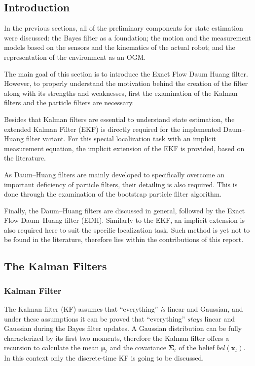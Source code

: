 \subsection{Introduction}

In the previous sections, all of the preliminary components for
state estimation were discussed:
the Bayes filter as a foundation;
the motion and the measurement models based on the
sensors and the kinematics of the actual robot;
and the representation of the environment as an OGM.

The main goal of this section is to introduce the Exact Flow Daum Huang filter. However, to properly understand the motivation behind
the creation of the filter along with its strengths and weaknesses, first the
examination of the Kalman filters and the particle filters are necessary.

Besides that Kalman filters are essential to understand state estimation,
the extended Kalman Filter (EKF) is directly required for the implemented Daum--Huang filter variant. For this special localization task with
an implicit measurement equation, the implicit extension of the EKF is provided, based on the literature.

As Daum--Huang filters are mainly developed to specifically overcome
an important deficiency of particle filters, their detailing is
also required. This is done through the examination of the bootstrap particle filter algorithm.

Finally, the Daum--Huang filters are discussed in general,
followed by the Exact Flow Daum--Huang filter (EDH). Similarly to the EKF,
an implicit extension is also required here to suit the
specific localization task. Such method is  yet not to be found in the literature, therefore lies within the contributions
of this report.
\subsection{The Kalman Filters}
\subsubsection{Kalman Filter}
The Kalman filter (KF) assumes that ``everything'' \emph{is} linear and Gaussian,
and under these assumptions it can be proved that ``everything'' \emph{stays} linear and Gaussian during the Bayes filter updates.
A Gaussian distribution can be fully characterized by its first two moments,
therefore the Kalman filter offers a recursion to calculate the mean $\boldsymbol{\mu}_t$ and the covariance $\mathbf{\Sigma}_t$ of the belief $bel(\mathbf{x}_t)$.
In this context only the discrete-time KF is going to be discussed.

